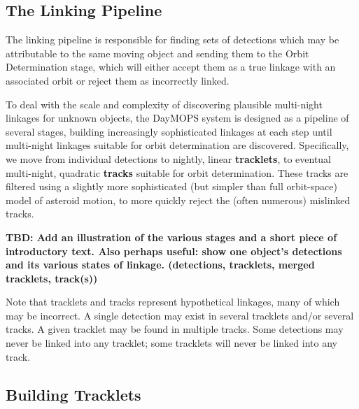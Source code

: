 \subsection{The Linking Pipeline}
The linking pipeline is responsible for finding sets of detections
which may be attributable to the same moving object and sending them
to the Orbit Determination stage, which will either accept them as a
true linkage with an associated orbit or reject them as incorrectly
linked.  

To deal with the scale and complexity of discovering plausible
multi-night linkages for unknown objects, the DayMOPS system is
designed as a pipeline of several stages, building increasingly
sophisticated linkages at each step until multi-night linkages
suitable for orbit determination are discovered.  Specifically, we
move from individual detections to nightly, linear \textbf{tracklets},
to eventual multi-night, quadratic \textbf{tracks} suitable for orbit
determination.  These tracks are filtered using a slightly more
sophisticated (but simpler than full orbit-space) model of asteroid
motion, to more quickly reject the (often numerous) mislinked tracks.

\textbf{TBD: Add an illustration of the various stages and a short piece of
introductory text.  Also perhaps useful: show one object's detections and its various states of linkage. (detections, tracklets, merged tracklets, track(s))}


Note that tracklets and tracks represent hypothetical linkages, many
of which may be incorrect.  A single detection may exist in several
tracklets and/or several tracks.  A given tracklet may be found in
multiple tracks.  Some detections may never be linked into any
tracklet; some tracklets will never be linked into any track.  





\subsection{Building Tracklets}

